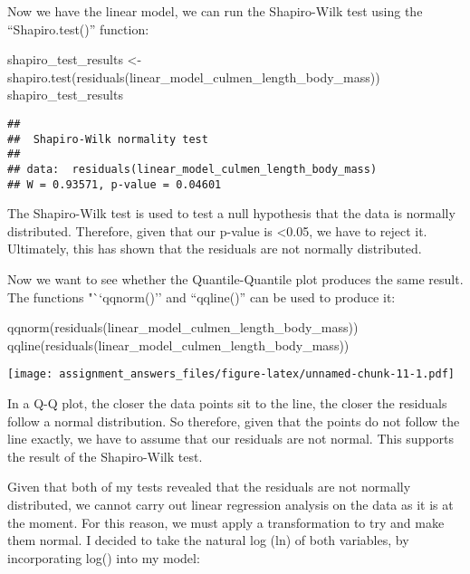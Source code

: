 \documentclass[
]{article}
\newenvironment{Shaded}{\begin{snugshade}}{\end{snugshade}}
\newcommand{\FunctionTok}[1]{\textcolor[rgb]{0.00,0.00,0.00}{#1}}
\newcommand{\NormalTok}[1]{#1}
\newcommand{\OtherTok}[1]{\textcolor[rgb]{0.56,0.35,0.01}{#1}}
\begin{document}
Now we have the linear model, we can run the Shapiro-Wilk test using the
``Shapiro.test()'' function:

\begin{Shaded}
\begin{Highlighting}[]
\NormalTok{shapiro\_test\_results }\OtherTok{\textless{}{-}} \FunctionTok{shapiro.test}\NormalTok{(}\FunctionTok{residuals}\NormalTok{(linear\_model\_culmen\_length\_body\_mass))}
\NormalTok{shapiro\_test\_results}
\end{Highlighting}
\end{Shaded}

\begin{verbatim}
## 
##  Shapiro-Wilk normality test
## 
## data:  residuals(linear_model_culmen_length_body_mass)
## W = 0.93571, p-value = 0.04601
\end{verbatim}

The Shapiro-Wilk test is used to test a null hypothesis that the data is
normally distributed. Therefore, given that our p-value is
\textless0.05, we have to reject it. Ultimately, this has shown that the
residuals are not normally distributed.

Now we want to see whether the Quantile-Quantile plot produces the same
result. The functions "``qqnorm()'' and ``qqline()'' can be used to
produce it:

\begin{Shaded}
\begin{Highlighting}[]
\FunctionTok{qqnorm}\NormalTok{(}\FunctionTok{residuals}\NormalTok{(linear\_model\_culmen\_length\_body\_mass)) }
\FunctionTok{qqline}\NormalTok{(}\FunctionTok{residuals}\NormalTok{(linear\_model\_culmen\_length\_body\_mass))}
\end{Highlighting}
\end{Shaded}

\texttt{[image: assignment\_answers\_files/figure-latex/unnamed-chunk-11-1.pdf]}

In a Q-Q plot, the closer the data points sit to the line, the closer
the residuals follow a normal distribution. So therefore, given that the
points do not follow the line exactly, we have to assume that our
residuals are not normal. This supports the result of the Shapiro-Wilk
test.

Given that both of my tests revealed that the residuals are not normally
distributed, we cannot carry out linear regression analysis on the data
as it is at the moment. For this reason, we must apply a transformation
to try and make them normal. I decided to take the natural log (ln) of
both variables, by incorporating log() into my model:
\end{document}
